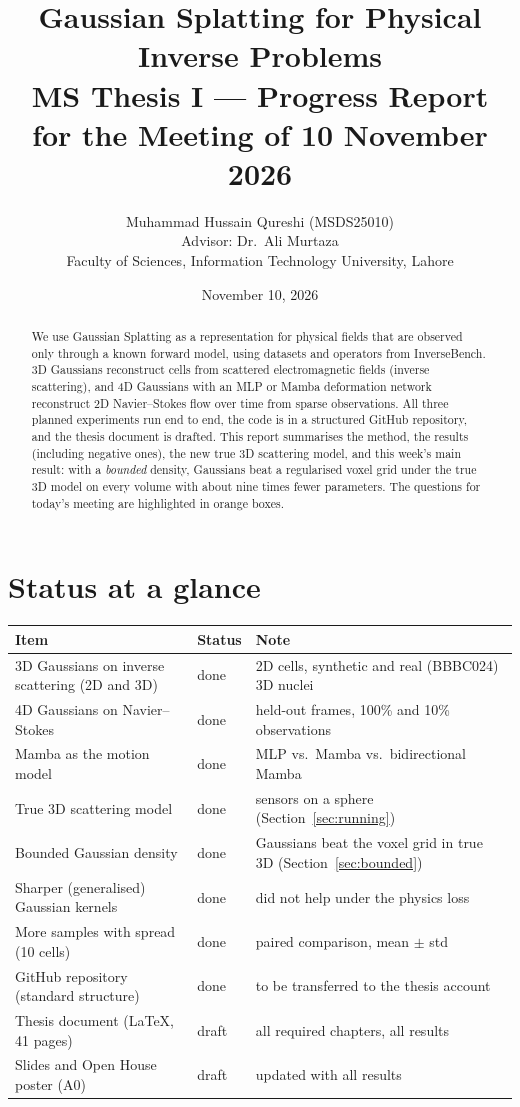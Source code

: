\documentclass[11pt,a4paper]{article}
\title{\textbf{Gaussian Splatting for Physical Inverse Problems}\\[4pt]
\large MS Thesis I --- Progress Report for the Meeting of 10 November 2026}
\author{Muhammad Hussain Qureshi (MSDS25010)\\
Advisor: Dr.\ Ali Murtaza\\
Faculty of Sciences, Information Technology University, Lahore}
\date{November 10, 2026}
\begin{document}
\maketitle

\begin{abstract}
\noindent We use Gaussian Splatting as a representation for physical fields that are observed only through a known
forward model, using datasets and operators from InverseBench. 3D Gaussians reconstruct cells from scattered
electromagnetic fields (inverse scattering), and 4D Gaussians with an MLP or Mamba deformation network reconstruct
2D Navier--Stokes flow over time from sparse observations. All three planned experiments run end to end, the code is
in a structured GitHub repository, and the thesis document is drafted. This report summarises the method, the
results (including negative ones), the new true 3D scattering model, and this week's main result: with a
\emph{bounded} density, Gaussians beat a regularised voxel grid under the true 3D model on every volume with about nine
times fewer parameters. The questions for today's meeting are highlighted in orange boxes.
\end{abstract}

\section{Status at a glance}
\begin{table}[H]
\centering
\begin{tabular}{p{6.3cm}p{2.3cm}p{6.3cm}}
\toprule
Item & Status & Note \\
\midrule
3D Gaussians on inverse scattering (2D and 3D) & done & 2D cells, synthetic and real (BBBC024) 3D nuclei \\
4D Gaussians on Navier--Stokes & done & held-out frames, 100\% and 10\% observations \\
Mamba as the motion model & done & MLP vs.\ Mamba vs.\ bidirectional Mamba \\
True 3D scattering model & done & sensors on a sphere (Section~\ref{sec:running}) \\
Bounded Gaussian density & done & Gaussians beat the voxel grid in true 3D (Section~\ref{sec:bounded}) \\
Sharper (generalised) Gaussian kernels & done & did not help under the physics loss \\
More samples with spread (10 cells) & done & paired comparison, mean $\pm$ std \\
GitHub repository (standard structure) & done & to be transferred to the thesis account \\
Thesis document (LaTeX, 41 pages) & draft & all required chapters, all results \\
Slides and Open House poster (A0) & draft & updated with all results \\
\bottomrule
\end{tabular}
\end{table}
\end{document}
